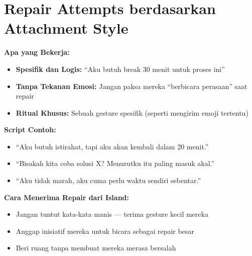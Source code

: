 \section{Repair Attempts berdasarkan Attachment Style}

\begin{praktikbox}
\textbf{Apa yang Bekerja:}
\begin{itemize}
    \item \textbf{Spesifik dan Logis:} ``Aku butuh break 30 menit untuk proses ini''
    \item \textbf{Tanpa Tekanan Emosi:} Jangan paksa mereka ``berbicara perasaan'' saat repair
    \item \textbf{Ritual Khusus:} Sebuah gesture spesifik (seperti mengirim emoji tertentu)
\end{itemize}

\textbf{Script Contoh:}
\begin{itemize}
    \item ``Aku butuh istirahat, tapi aku akan kembali dalam 20 menit.''
    \item ``Bisakah kita coba solusi X? Menurutku itu paling masuk akal.''
    \item ``Aku tidak marah, aku cuma perlu waktu sendiri sebentar.''
\end{itemize}

\textbf{Cara Menerima Repair dari Island:}
\begin{itemize}
    \item Jangan tuntut kata-kata manis --- terima gesture kecil mereka
    \item Anggap inisiatif mereka untuk bicara sebagai repair besar
    \item Beri ruang tanpa membuat mereka merasa bersalah
\end{itemize}
\end{praktikbox}

